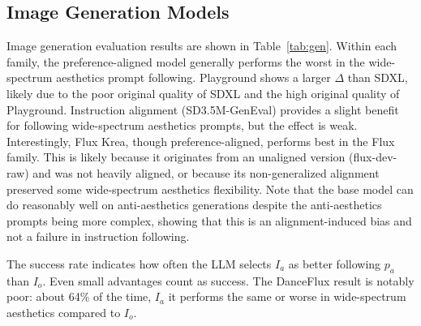


\subsection{Image Generation Models}
Image generation evaluation results are shown in Table~\ref{tab:gen}. Within each family, the preference-aligned model generally performs the worst in the wide-spectrum aesthetics prompt following. Playground shows a larger $\Delta$ than SDXL, likely due to the poor original quality of SDXL and the high original quality of Playground. Instruction alignment (SD3.5M-GenEval) provides a slight benefit for following wide-spectrum aesthetics prompts, but the effect is weak. Interestingly, Flux Krea, though preference-aligned, performs best in the Flux family. This is likely because it originates from an unaligned version (flux-dev-raw) and was not heavily aligned, or because its non-generalized alignment preserved some wide-spectrum aesthetics flexibility. Note that the base model can do reasonably well on anti-aesthetics generations despite the anti-aesthetics prompts being more complex, showing that this is an alignment-induced bias and not a failure in instruction following. 

The success rate indicates how often the LLM selects $I_a$ as better following $p_a$ than $I_o$. Even small advantages count as success. The DanceFlux result is notably poor: about 64\% of the time, $I_a$ it performs the same or worse in wide-spectrum aesthetics compared to $I_o$.


